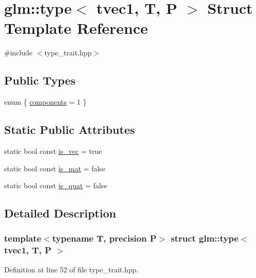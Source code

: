 \hypertarget{structglm_1_1type_3_01tvec1_00_01_t_00_01_p_01_4}{}\section{glm\+::type$<$ tvec1, T, P $>$ Struct Template Reference}
\label{structglm_1_1type_3_01tvec1_00_01_t_00_01_p_01_4}


{\ttfamily \#include $<$type\+\_\+trait.\+hpp$>$}

\subsection*{Public Types}
\begin{DoxyCompactItemize}
\item 
enum \{ \mbox{\hyperlink{structglm_1_1type_3_01tvec1_00_01_t_00_01_p_01_4_a801d6fb0c96187fb37eb20ffe0342732a74d2b822bba98b221d517a69a40459f7}{components}} = 1
 \}
\end{DoxyCompactItemize}
\subsection*{Static Public Attributes}
\begin{DoxyCompactItemize}
\item 
static bool const \mbox{\hyperlink{structglm_1_1type_3_01tvec1_00_01_t_00_01_p_01_4_adbc01bdae03ced483f6879a6c480f0fa}{is\+\_\+vec}} = true
\item 
static bool const \mbox{\hyperlink{structglm_1_1type_3_01tvec1_00_01_t_00_01_p_01_4_adbe064ba8e73ecdd44594a3544d31101}{is\+\_\+mat}} = false
\item 
static bool const \mbox{\hyperlink{structglm_1_1type_3_01tvec1_00_01_t_00_01_p_01_4_af558f7c8789d4153d3a859e75aa76040}{is\+\_\+quat}} = false
\end{DoxyCompactItemize}


\subsection{Detailed Description}
\subsubsection*{template$<$typename T, precision P$>$\newline
struct glm\+::type$<$ tvec1, T, P $>$}



Definition at line 52 of file type\+\_\+trait.\+hpp.



